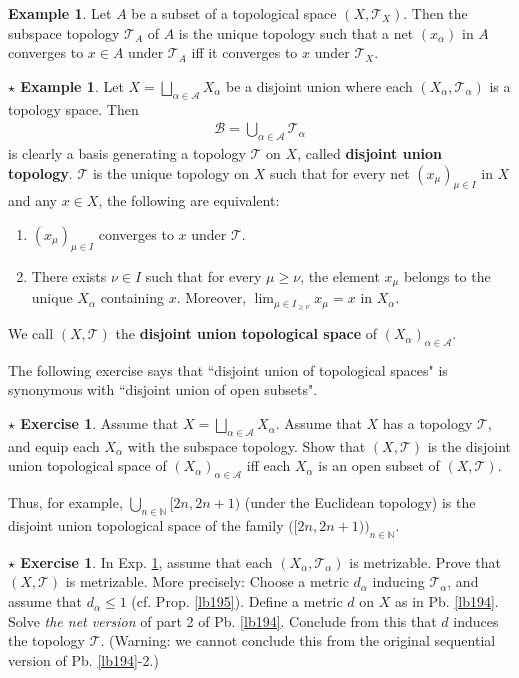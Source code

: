 \documentclass[12pt,b5paper,notitlepage]{article}
\theoremstyle{definition}
\newtheorem{eg}[df]{Example}
\newtheorem{seg}[df]{$\star$ Example}
\newtheorem{sexe}[df]{$\star$ Exercise}
\theoremstyle{plain}
\newcommand{\mc}{\mathcal}
\newcommand{\scr}{\mathscr}
\newcommand{\Nbb}{\mathbb N}
\numberwithin{equation}{section}
\begin{document}
\begin{eg}
Let $A$ be a subset of a topological space $(X,\mc T_X)$. Then the subspace topology $\mc T_A$ of $A$ is the unique topology such that a net $(x_\alpha)$ in $A$ converges to $x\in A$ under $\mc T_A$ iff it converges to $x$ under $\mc T_X$.
\end{eg}

\begin{seg}\label{lb193}
Let $X=\bigsqcup_{\alpha\in \scr A}X_\alpha$ be a disjoint union where each $(X_\alpha,\mc T_\alpha)$ is a topology space. Then
\begin{align*}
\mc B=\bigcup_{\alpha\in\scr A}\mc T_\alpha
\end{align*}
is clearly a basis generating a topology $\mc T$ on $X$, called \textbf{disjoint union topology}.    $\mc T$ is the unique topology on $X$ such that for every net $(x_\mu)_{\mu\in I}$ in $X$ and any $x\in X$, the following are equivalent:
\begin{enumerate}[label=(\arabic*)]
\item $(x_\mu)_{\mu\in I}$ converges to $x$ under $\mc T$.
\item There exists $\nu\in I$ such that for every $\mu\geq\nu$, the element $x_\mu$ belongs to the unique $X_\alpha$ containing $x$. Moreover, $\lim_{\mu\in I_{\geq\nu}}x_\mu=x$ in $X_\alpha$.
\end{enumerate}
We call $(X,\mc T)$ the \textbf{disjoint union topological space}  of $(X_\alpha)_{\alpha\in\scr A}$.
\end{seg}

The following exercise says that ``disjoint union of topological spaces" is synonymous with ``disjoint union of open subsets".

\begin{sexe}
Assume that $X=\bigsqcup_{\alpha\in\scr A}X_\alpha$. Assume that $X$ has a topology $\mc T$, and equip each $X_\alpha$ with the subspace topology. Show that $(X,\mc T)$ is the disjoint union topological space of $(X_\alpha)_{\alpha\in\scr A}$ iff each $X_\alpha$ is an open subset of $(X,\mc T)$.
\end{sexe}

Thus, for example, $\bigcup_{n\in\Nbb} [2n,2n+1)$ (under the Euclidean topology) is the disjoint union topological space of the family $\big([2n,2n+1)\big)_{n\in\Nbb}$.


\begin{sexe}
In Exp. \ref{lb193}, assume that each $(X_\alpha,\mc T_\alpha)$ is metrizable. Prove that $(X,\mc T)$ is metrizable. More precisely: Choose a metric $d_\alpha$ inducing $\mc T_\alpha$, and assume that $d_\alpha\leq 1$ (cf. Prop. \ref{lb195}). Define a metric $d$ on $X$ as in Pb. \ref{lb194}. Solve \textit{the net version} of part 2 of Pb. \ref{lb194}. Conclude from this that $d$ induces the topology $\mc T$. (Warning: we cannot conclude this from the original sequential version of Pb. \ref{lb194}-2.)
\end{sexe}
\end{document}
